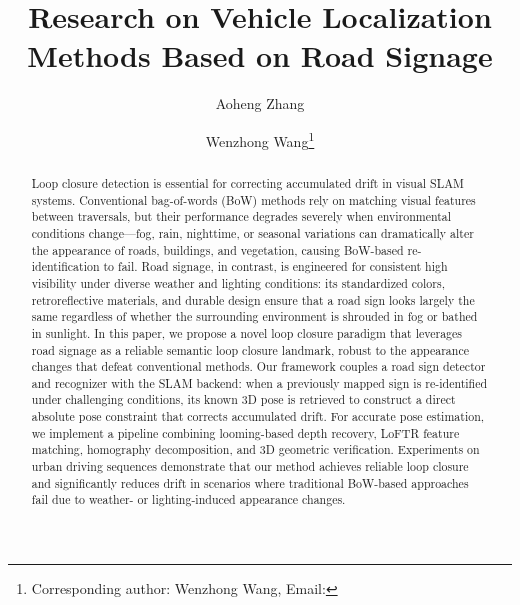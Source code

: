 \documentclass[runningheads]{llncs}
\begin{document}
\title{Research on Vehicle Localization Methods Based on Road Signage}%






\author{
Aoheng Zhang  \and 
Wenzhong Wang\thanks{Corresponding author: Wenzhong Wang, Email: }
}      







\maketitle              %
\begin{abstract}
Loop closure detection is essential for correcting accumulated drift in visual SLAM systems.
Conventional bag-of-words (BoW) methods rely on matching visual features between traversals,
but their performance degrades severely when environmental conditions change---fog, rain,
nighttime, or seasonal variations can dramatically alter the appearance of roads, buildings,
and vegetation, causing BoW-based re-identification to fail. Road signage, in contrast, is
engineered for consistent high visibility under diverse weather and lighting conditions:
its standardized colors, retroreflective materials, and durable design ensure that a road sign
looks largely the same regardless of whether the surrounding environment is shrouded in fog
or bathed in sunlight. In this paper, we propose a novel loop closure paradigm that leverages
road signage as a reliable semantic loop closure landmark, robust to the appearance changes
that defeat conventional methods. Our framework couples a road sign detector and recognizer
with the SLAM backend: when a previously mapped sign is re-identified under challenging
conditions, its known 3D pose is retrieved to construct a direct absolute pose constraint that
corrects accumulated drift. For accurate pose estimation, we implement a pipeline combining
looming-based depth recovery, LoFTR feature matching, homography decomposition, and 3D
geometric verification. Experiments on urban driving sequences demonstrate that our method
achieves reliable loop closure and significantly reduces drift in scenarios where traditional
BoW-based approaches fail due to weather- or lighting-induced appearance changes.

\end{abstract}
\end{document}
